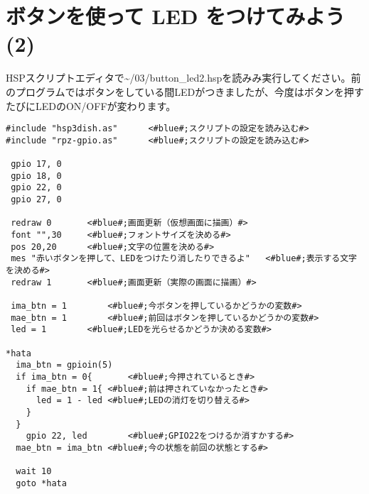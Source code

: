 \newpage
\section{ボタンを使って LED をつけてみよう (2)}
HSPスクリプトエディタで\textasciitilde /03/button\_led2.hspを読みみ実行してください。前のプログラムではボタンをしている間LEDがつきましたが、今度はボタンを押すたびにLEDのON/OFFが変わります。\\

\begin{lstlisting}[caption=\textasciitilde/03/button\_led2.hsp,label=button_led2.hsp]
#include "hsp3dish.as"		<#blue#;スクリプトの設定を読み込む#>
#include "rpz-gpio.as"		<#blue#;スクリプトの設定を読み込む#>

 gpio 17, 0
 gpio 18, 0
 gpio 22, 0
 gpio 27, 0
	
 redraw 0		<#blue#;画面更新（仮想画面に描画）#>
 font "",30		<#blue#;フォントサイズを決める#>
 pos 20,20		<#blue#;文字の位置を決める#>
 mes "赤いボタンを押して、LEDをつけたり消したりできるよ"	<#blue#;表示する文字を決める#>
 redraw 1		<#blue#;画面更新（実際の画面に描画）#>

 ima_btn = 1		<#blue#;今ボタンを押しているかどうかの変数#>
 mae_btn = 1		<#blue#;前回はボタンを押しているかどうかの変数#>
 led = 1		<#blue#;LEDを光らせるかどうか決める変数#>

*hata
  ima_btn = gpioin(5)
  if ima_btn = 0{		<#blue#;今押されているとき#>
    if mae_btn = 1{	<#blue#;前は押されていなかったとき#>
      led = 1 - led	<#blue#;LEDの消灯を切り替える#>
    }
  }
    gpio 22, led		<#blue#;GPIO22をつけるか消すかする#>
  mae_btn = ima_btn	<#blue#;今の状態を前回の状態とする#>

  wait 10
  goto *hata
\end{lstlisting}


